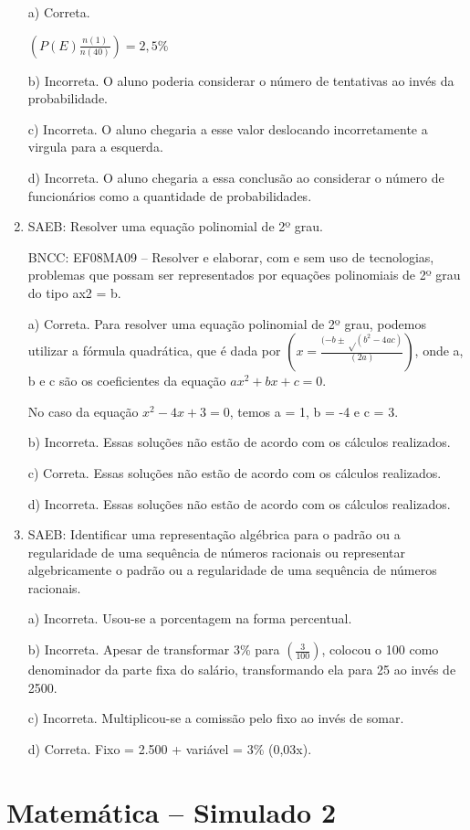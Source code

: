 \begin{enumerate}
a) Correta.

$(P(E)\frac{n(1)}{n(40)})= 2,5\%$

b) Incorreta. O aluno poderia considerar o número de tentativas ao
invés da probabilidade.

c) Incorreta. O aluno chegaria a esse valor deslocando
incorretamente a virgula para a esquerda.

d) Incorreta. O aluno chegaria a essa conclusão ao considerar o
número de funcionários como a quantidade de probabilidades.

\item SAEB: Resolver uma equação polinomial de 2º grau.

BNCC: EF08MA09 -- Resolver e elaborar, com e sem uso de tecnologias,
problemas que possam ser representados por equações polinomiais de 2º
grau do tipo ax2 = b.

a) Correta. Para resolver uma equação polinomial de 2º grau,
podemos utilizar a fórmula quadrática, que é dada por
$(x = \frac{(-b ± √(b^2 - 4ac)} {(2a)})$, onde a, b e c são os
coeficientes da equação $ax^2 + bx + c = 0$.

No caso da equação $x^2 - 4x + 3 = 0$, temos a = 1, b = -4 e c = 3.

b) Incorreta. Essas soluções não estão de acordo com os cálculos
realizados.

c) Correta. Essas soluções não estão de acordo com os cálculos
realizados.

d) Incorreta. Essas soluções não estão de acordo com os cálculos
realizados.

\item SAEB: Identificar uma representação algébrica para o padrão ou a
regularidade de uma sequência de números racionais ou representar
algebricamente o padrão ou a regularidade de uma sequência de números
racionais.

a) Incorreta. Usou-se a porcentagem na forma percentual.

b) Incorreta. Apesar de transformar 3\% para $(\frac{3}{100})$,
colocou o 100 como denominador da parte fixa do salário, transformando
ela para 25 ao invés de 2500.

c) Incorreta. Multiplicou-se a comissão pelo fixo ao invés de somar.

d) Correta. Fixo = 2.500 + variável = 3\% (0,03x).
\end{enumerate}


\section*{Matemática – Simulado 2}

